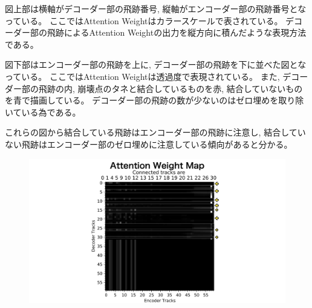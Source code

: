 図上部は横軸がデコーダー部の飛跡番号, 縦軸がエンコーダー部の飛跡番号となっている。
ここではAttention Weightはカラースケールで表されている。
デコーダー部の飛跡によるAttention Weightの出力を縦方向に積んだような表現方法である。

図下部はエンコーダー部の飛跡を上に, デコーダー部の飛跡を下に並べた図となっている。
ここではAttention Weightは透過度で表現されている。
また, デコーダー部の飛跡の内, 崩壊点のタネと結合しているものを赤, 結合していないものを青で描画している。
デコーダー部の飛跡の数が少ないのはゼロ埋めを取り除いている為である。

これらの図から結合している飛跡はエンコーダー部の飛跡に注意し, 結合していない飛跡はエンコーダー部のゼロ埋めに注意している傾向があると分かる。

\begin{figure}[htbp]
 \centering
   \begin{minipage}{1.0\textwidth}
    \centering
    \includegraphics[trim = 200 0 200 0, width=1.0\textwidth, clip]{Figure/3Networks/3-4-3-3AttentionWeightMap.png}
   \end{minipage}
   

\end{figure}

